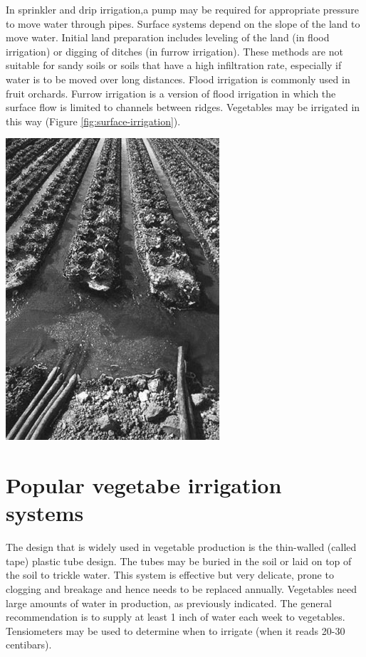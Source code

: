 \documentclass[
]{article}
\begin{document}
In sprinkler and drip irrigation,a pump may be required for appropriate pressure to move water through pipes. Surface systems depend on the slope of the land to move water. Initial land preparation includes leveling of the land (in flood irrigation) or digging of ditches (in furrow irrigation). These methods are not suitable for sandy soils or soils that have a high infiltration rate, especially if water is to be moved over long distances. Flood irrigation is commonly used in fruit orchards. Furrow irrigation is a version of flood irrigation in which the surface flow is limited to channels between ridges. Vegetables may be irrigated in this way (Figure \ref{fig:surface-irrigation}).

\includegraphics[width=0.65\linewidth]{../images/irrigation/Surface_irrigation}

\hypertarget{popular-vegetabe-irrigation-systems}{%
\section{Popular vegetabe irrigation systems}\label{popular-vegetabe-irrigation-systems}}

The design that is widely used in vegetable production is the thin-walled (called tape) plastic tube design. The tubes may be buried in the soil or laid on top of the soil to trickle water. This system is effective but very delicate, prone to clogging and breakage and hence needs to be replaced annually. Vegetables need large amounts of water in production, as previously indicated. The general recommendation is to supply at least 1 inch of water each week to vegetables. Tensiometers may be used to determine when to irrigate (when it reads 20-30 centibars).
\end{document}

